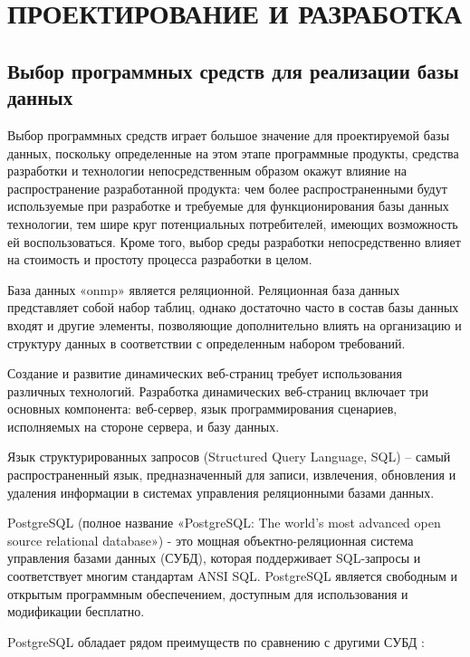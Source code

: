 \section{ПРОЕКТИРОВАНИЕ И РАЗРАБОТКА}

\subsection{Выбор программных средств для реализации базы данных}

Выбор программных средств играет большое значение для проектируемой базы данных, поскольку определенные на этом этапе программные продукты, средства разработки и технологии непосредственным образом окажут влияние на распространение разработанной продукта: чем более распространенными будут используемые при разработке и требуемые для функционирования базы данных технологии, тем шире круг потенциальных потребителей, имеющих возможность ей воспользоваться. Кроме того, выбор среды разработки непосредственно влияет на стоимость и простоту процесса разработки в целом.

База данных «onmp» является реляционной. Реляционная база данных представляет собой набор таблиц, однако достаточно часто в состав базы данных входят и другие элементы, позволяющие дополнительно влиять на организацию и структуру данных в соответствии с определенным набором требований.

Создание и развитие динамических веб-страниц требует использования различных технологий. Разработка динамических веб-страниц включает три основных компонента: веб-сервер, язык программирования сценариев, исполняемых на стороне сервера, и базу данных.

Язык структурированных запросов (Structured Query Language, SQL) – самый распространенный язык, предназначенный для записи, извлечения, обновления и удаления информации в системах управления реляционными базами данных.

PostgreSQL (полное название «PostgreSQL: The world's most advanced open source relational database») - это мощная объектно-реляционная система управления базами данных (СУБД), которая поддерживает SQL-запросы и соответствует многим стандартам ANSI SQL. PostgreSQL является свободным и открытым программным обеспечением, доступным для использования и модификации бесплатно.

PostgreSQL обладает рядом преимуществ по сравнению с другими СУБД \cite{book2, book3} :

